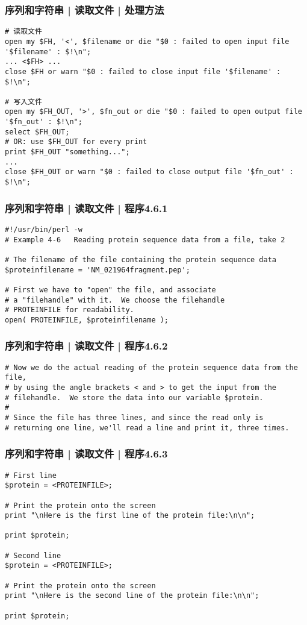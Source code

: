\begin{frame}[fragile]
  \frametitle{序列和字符串 | 读取文件 | \alert{处理方法}}
\begin{lstlisting}[basicstyle=\small\tt]
# 读取文件
open my $FH, '<', $filename or die "$0 : failed to open input file '$filename' : $!\n";
... <$FH> ...
close $FH or warn "$0 : failed to close input file '$filename' : $!\n";

# 写入文件
open my $FH_OUT, '>', $fn_out or die "$0 : failed to open output file '$fn_out' : $!\n";
select $FH_OUT;
# OR: use $FH_OUT for every print
print $FH_OUT "something...";
... 
close $FH_OUT or warn "$0 : failed to close output file '$fn_out' : $!\n";
\end{lstlisting}
\end{frame}

\begin{frame}[fragile]
  \frametitle{序列和字符串 | 读取文件 | 程序4.6.1}
\begin{lstlisting}
#!/usr/bin/perl -w
# Example 4-6   Reading protein sequence data from a file, take 2

# The filename of the file containing the protein sequence data
$proteinfilename = 'NM_021964fragment.pep';

# First we have to "open" the file, and associate
# a "filehandle" with it.  We choose the filehandle
# PROTEINFILE for readability.
open( PROTEINFILE, $proteinfilename );
\end{lstlisting}
\end{frame}

\begin{frame}[fragile]
  \frametitle{序列和字符串 | 读取文件 | 程序4.6.2}
\begin{lstlisting}[firstnumber=12]
# Now we do the actual reading of the protein sequence data from the file,
# by using the angle brackets < and > to get the input from the
# filehandle.  We store the data into our variable $protein.
#
# Since the file has three lines, and since the read only is
# returning one line, we'll read a line and print it, three times.
\end{lstlisting}
\end{frame}

\begin{frame}[fragile]
  \frametitle{序列和字符串 | 读取文件 | 程序4.6.3}
\begin{lstlisting}[firstnumber=19,basicstyle=\small\tt]
# First line
$protein = <PROTEINFILE>;

# Print the protein onto the screen
print "\nHere is the first line of the protein file:\n\n";

print $protein;

# Second line
$protein = <PROTEINFILE>;

# Print the protein onto the screen
print "\nHere is the second line of the protein file:\n\n";

print $protein;
\end{lstlisting}
\end{frame}

